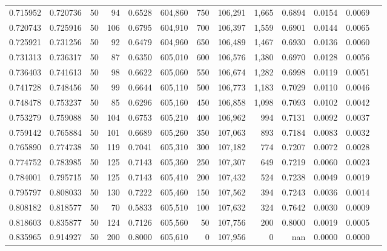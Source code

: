 \begin{tabular}{rrrrrrrrrrrrr}
0.715952 & 0.720736 &    50 &  94 &                                     0.6528 & 604,860 &     750 & 106,291 &   1,665 & 0.6894 & 0.0154 & 0.0069 \\
0.720743 & 0.725916 &    50 & 106 &                                     0.6795 & 604,910 &     700 & 106,397 &   1,559 & 0.6901 & 0.0144 & 0.0065 \\
0.725921 & 0.731256 &    50 &  92 &                                     0.6479 & 604,960 &     650 & 106,489 &   1,467 & 0.6930 & 0.0136 & 0.0060 \\
0.731313 & 0.736317 &    50 &  87 &                                     0.6350 & 605,010 &     600 & 106,576 &   1,380 & 0.6970 & 0.0128 & 0.0056 \\
0.736403 & 0.741613 &    50 &  98 &                                     0.6622 & 605,060 &     550 & 106,674 &   1,282 & 0.6998 & 0.0119 & 0.0051 \\
0.741728 & 0.748456 &    50 &  99 &                                     0.6644 & 605,110 &     500 & 106,773 &   1,183 & 0.7029 & 0.0110 & 0.0046 \\
0.748478 & 0.753237 &    50 &  85 &                                     0.6296 & 605,160 &     450 & 106,858 &   1,098 & 0.7093 & 0.0102 & 0.0042 \\
0.753279 & 0.759088 &    50 & 104 &                                     0.6753 & 605,210 &     400 & 106,962 &     994 & 0.7131 & 0.0092 & 0.0037 \\
0.759142 & 0.765884 &    50 & 101 &                                     0.6689 & 605,260 &     350 & 107,063 &     893 & 0.7184 & 0.0083 & 0.0032 \\
0.765890 & 0.774738 &    50 & 119 &                                     0.7041 & 605,310 &     300 & 107,182 &     774 & 0.7207 & 0.0072 & 0.0028 \\
0.774752 & 0.783985 &    50 & 125 &                                     0.7143 & 605,360 &     250 & 107,307 &     649 & 0.7219 & 0.0060 & 0.0023 \\
0.784001 & 0.795715 &    50 & 125 &                                     0.7143 & 605,410 &     200 & 107,432 &     524 & 0.7238 & 0.0049 & 0.0019 \\
0.795797 & 0.808033 &    50 & 130 &                                     0.7222 & 605,460 &     150 & 107,562 &     394 & 0.7243 & 0.0036 & 0.0014 \\
0.808182 & 0.818577 &    50 &  70 &                                     0.5833 & 605,510 &     100 & 107,632 &     324 & 0.7642 & 0.0030 & 0.0009 \\
0.818603 & 0.835877 &    50 & 124 &                                     0.7126 & 605,560 &      50 & 107,756 &     200 & 0.8000 & 0.0019 & 0.0005 \\
0.835965 & 0.914927 &    50 & 200 &                                     0.8000 & 605,610 &       0 & 107,956 &       0 &    nan & 0.0000 & 0.0000 \\
\bottomrule
\end{tabular}
